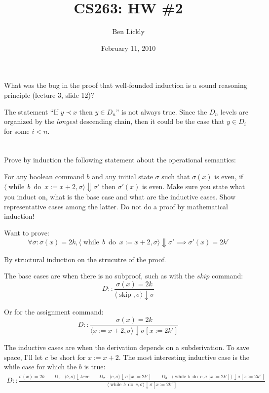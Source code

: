\documentclass{article}
\title{CS263: HW \#2}
\author{Ben Lickly}
\date{February 11, 2010}
\newcommand{\problem}[1]
{\subsubsection*{} %
\vspace{-16pt} \section{} \vspace{-22pt} \qquad
#1%
\bigskip \bigskip
}
\begin{document}
\maketitle
\problem{
What was the bug in the proof that well-founded induction is a sound
reasoning principle (lecture 3, slide 12)?
}

  The statement ``If $y \prec x$ then $y \in D_n$'' is not always true. Since the
  $D_n$ levels are organized by the \emph{longest} descending chain, then it
  could be the case that $y \in D_i$ for some $i < n$.
  
\problem{
Prove by induction the following statement about the operational semantics:

\newcommand{\while}[2]{\operatorname{while}\, #1\ \operatorname{do}\ #2}

For any boolean command $b$ and any initial state $\sigma$ such that $\sigma(x)$
is even, if $\langle \while{b}{x := x + 2}, \sigma \rangle \Downarrow \sigma'$
then $\sigma'(x)$ is even. Make sure you state what you induct on, what is the
base case and what are the inductive cases. Show representative cases among
the latter. Do not do a proof by mathematical induction!
}

Want to prove:
\[
\forall \sigma : \sigma(x) = 2k, \langle \while{b}{x := x + 2}, \sigma
\rangle \Downarrow \sigma' \implies \sigma'(x) = 2k'
\]

By structural induction on the strucutre of the proof.

\newcommand{\skp}{\operatorname{skip}}
The base cases are when there is no subproof, such as with the $skip$ command:
\[
D :: \frac{\sigma(x) = 2k}{
\langle \skp, \sigma \rangle \downarrow \sigma
}
\]

Or for the assignment command:
\[
D :: \frac{\sigma(x) = 2k}{
\langle x := x+2, \sigma \rangle \downarrow \sigma[x := 2k']
}
\]

The inductive cases are when the derivation depends on a subderivation.
To save space, I'll let $c$ be short for $x := x + 2$.
The most interesting inductive case is the while case for which the $b$ is true:
\begin{align*}
D :: \frac{
\sigma(x) = 2k
\qquad
D_1 :: \langle b, \sigma \rangle \downarrow true
\qquad
D_2 :: \langle c, \sigma \rangle \downarrow \sigma[x := 2k']
\qquad
D_3 :: \langle \while{b}{c}, \sigma[x := 2k'] \rangle \downarrow \sigma[x :=
2k''] }{
\langle \while{b}{c}, \sigma \rangle \downarrow \sigma[x := 2k'']
}
\end{align*}
\end{document}
